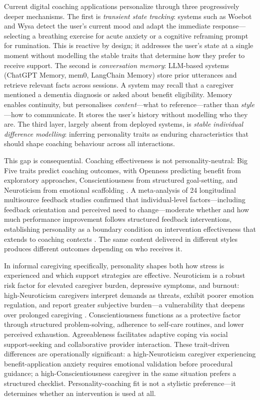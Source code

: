 \documentclass[10pt,a4paper]{report}
\begin{document}
Current digital coaching applications personalize through three progressively deeper mechanisms. The first is \emph{transient state tracking}: systems such as Woebot \citep{Fitzpatrick2017} and Wysa \citep{Inkster2018} detect the user's current mood and adapt the immediate response---selecting a breathing exercise for acute anxiety or a cognitive reframing prompt for rumination. This is reactive by design; it addresses the user's state at a single moment without modelling the stable traits that determine how they prefer to receive support. The second is \emph{conversation memory}: LLM-based systems (ChatGPT Memory, mem0, LangChain Memory) store prior utterances and retrieve relevant facts across sessions. A system may recall that a caregiver mentioned a dementia diagnosis or asked about benefit eligibility. Memory enables continuity, but personalises \emph{content}---what to reference---rather than \emph{style}---how to communicate. It stores the user's history without modelling who they are. The third layer, largely absent from deployed systems, is \emph{stable individual difference modelling}: inferring personality traits as enduring characteristics that should shape coaching behaviour across all interactions.

This gap is consequential. Coaching effectiveness is not personality-neutral: Big Five traits predict coaching outcomes, with Openness predicting benefit from exploratory approaches, Conscientiousness from structured goal-setting, and Neuroticism from emotional scaffolding \citep{deHaan2013, Jones2016}. A meta-analysis of 24 longitudinal multisource feedback studies confirmed that individual-level factors---including feedback orientation and perceived need to change---moderate whether and how much performance improvement follows structured feedback interventions, establishing personality as a boundary condition on intervention effectiveness that extends to coaching contexts \citep{Smither2005}. The same content delivered in different styles produces different outcomes depending on who receives it.

In informal caregiving specifically, personality shapes both how stress is experienced and which support strategies are effective. Neuroticism is a robust risk factor for elevated caregiver burden, depressive symptoms, and burnout: high-Neuroticism caregivers interpret demands as threats, exhibit poorer emotion regulation, and report greater subjective burden---a vulnerability that deepens over prolonged caregiving \citep{Penley2002, Brodaty2009}. Conscientiousness functions as a protective factor through structured problem-solving, adherence to self-care routines, and lower perceived exhaustion. Agreeableness facilitates adaptive coping via social support-seeking and collaborative provider interaction. These trait-driven differences are operationally significant: a high-Neuroticism caregiver experiencing benefit-application anxiety requires emotional validation before procedural guidance; a high-Conscientiousness caregiver in the same situation prefers a structured checklist. Personality-coaching fit is not a stylistic preference---it determines whether an intervention is used at all.
\end{document}

